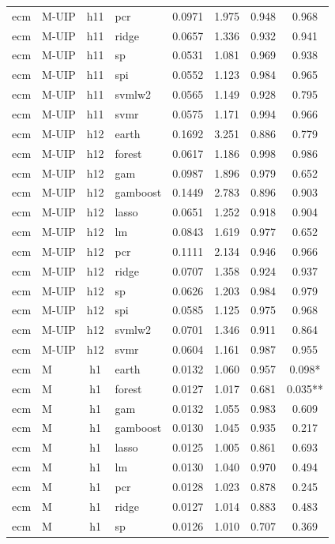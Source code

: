 \begin{ThreePartTable}
\begin{longtable}[t]{llclcccc}
ecm & M-UIP & h11 & pcr & 0.0971 & 1.975 & 0.948 & 0.968\\
ecm & M-UIP & h11 & ridge & 0.0657 & 1.336 & 0.932 & 0.941\\
ecm & M-UIP & h11 & sp & 0.0531 & 1.081 & 0.969 & 0.938\\
ecm & M-UIP & h11 & spi & 0.0552 & 1.123 & 0.984 & 0.965\\
ecm & M-UIP & h11 & svmlw2 & 0.0565 & 1.149 & 0.928 & 0.795\\
ecm & M-UIP & h11 & svmr & 0.0575 & 1.171 & 0.994 & 0.966\\
\addlinespace
ecm & M-UIP & h12 & earth & 0.1692 & 3.251 & 0.886 & 0.779\\
ecm & M-UIP & h12 & forest & 0.0617 & 1.186 & 0.998 & 0.986\\
ecm & M-UIP & h12 & gam & 0.0987 & 1.896 & 0.979 & 0.652\\
ecm & M-UIP & h12 & gamboost & 0.1449 & 2.783 & 0.896 & 0.903\\
ecm & M-UIP & h12 & lasso & 0.0651 & 1.252 & 0.918 & 0.904\\
ecm & M-UIP & h12 & lm & 0.0843 & 1.619 & 0.977 & 0.652\\
ecm & M-UIP & h12 & pcr & 0.1111 & 2.134 & 0.946 & 0.966\\
ecm & M-UIP & h12 & ridge & 0.0707 & 1.358 & 0.924 & 0.937\\
ecm & M-UIP & h12 & sp & 0.0626 & 1.203 & 0.984 & 0.979\\
ecm & M-UIP & h12 & spi & 0.0585 & 1.125 & 0.975 & 0.968\\
ecm & M-UIP & h12 & svmlw2 & 0.0701 & 1.346 & 0.911 & 0.864\\
ecm & M-UIP & h12 & svmr & 0.0604 & 1.161 & 0.987 & 0.955\\
\addlinespace
ecm & M & h1 & earth & 0.0132 & 1.060 & 0.957 & 0.098*\\
ecm & M & h1 & forest & 0.0127 & 1.017 & 0.681 & 0.035**\\
ecm & M & h1 & gam & 0.0132 & 1.055 & 0.983 & 0.609\\
ecm & M & h1 & gamboost & 0.0130 & 1.045 & 0.935 & 0.217\\
ecm & M & h1 & lasso & 0.0125 & 1.005 & 0.861 & 0.693\\
ecm & M & h1 & lm & 0.0130 & 1.040 & 0.970 & 0.494\\
ecm & M & h1 & pcr & 0.0128 & 1.023 & 0.878 & 0.245\\
ecm & M & h1 & ridge & 0.0127 & 1.014 & 0.883 & 0.483\\
ecm & M & h1 & sp & 0.0126 & 1.010 & 0.707 & 0.369\\

\end{longtable}
\end{ThreePartTable}
